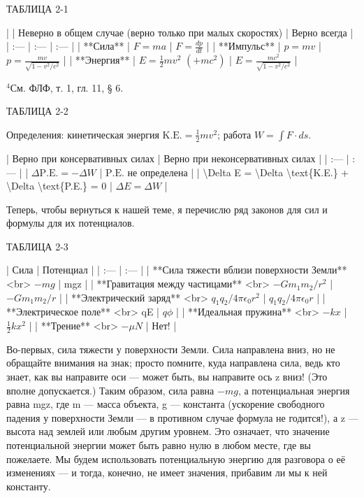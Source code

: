 \documentclass[10pt,oneside]{article}
\newcommand{\TipsRunning}[1]{\par\vspace{2bp}{\centering\footnotesize #1\par}\vspace{2bp}}
\newcommand{\TipsSubsection}[1]{\par\vspace{6bp}{\normalsize\bfseries #1\par}\vspace{2bp}}
\begin{document}
ТАБЛИЦА 2-1\par

| | Неверно в общем случае (верно только при малых скоростях) | Верно всегда | | :--- | :--- | :--- | | **Сила** | \(F = ma\) | \(F = \frac{dp}{dt}\) | | **Импульс** | \(p = mv\) | \(p = \frac{mv}{\sqrt{1-v^2/c^2}}\) | | **Энергия** | \(E = \frac{1}{2}mv^2\) \((+ mc^2)\) | \(E = \frac{mc^2}{\sqrt{1-v^2/c^2}}\) |\par

\(^4\)См. ФЛФ, т. 1, гл. 11, § 6.\par

\TipsRunning{З А К О Н Ы  И  И Н Т У И Ц И Я • 6 7}

ТАБЛИЦА 2-2\par

Определения: кинетическая энергия \(\text{K.E.} = \frac{1}{2}mv^2\); работа \(W = \int F \cdot ds\).\par

| Верно при консервативных силах | Верно при неконсервативных силах | | :--- | :--- | | \(\Delta \text{P.E.} = -\Delta W\) | \(\text{P.E.}\) не определена | | \textbackslash{}Delta E = \textbackslash{}Delta \textbackslash{}text\{K.E.\} + \textbackslash{}Delta \textbackslash{}text\{P.E.\} = 0 | \(\Delta E = \Delta W\) |\par

\TipsSubsection{2-4 Силы и их потенциалы}

Теперь, чтобы вернуться к нашей теме, я перечислю ряд законов для сил и формулы для их потенциалов.\par

ТАБЛИЦА 2-3\par

| Сила | Потенциал | | :--- | :--- | | **Сила тяжести вблизи поверхности Земли** <br> \(-mg\) | mgz | | **Гравитация между частицами** <br> \(-Gm_1m_2/r^2\) | \(-Gm_1m_2/r\) | | **Электрический заряд** <br> \(q_1q_2/4\pi\epsilon_0 r^2\) | \(q_1q_2/4\pi\epsilon_0 r\) | | **Электрическое поле** <br> qE | \(q\phi\) | | **Идеальная пружина** <br> \(-kx\) | \(\frac{1}{2}kx^2\) | | **Трение** <br> \(-\mu N\) | Нет! |\par

Во-первых, сила тяжести у поверхности Земли. Сила направлена вниз, но не обращайте внимания на знак; просто помните, куда направлена сила, ведь кто знает, как вы направите оси --- может быть, вы направите ось z вниз! (Это вполне допускается.) Таким образом, сила равна \(-mg\), а потенциальная энергия равна mgz, где m --- масса объекта, g --- константа (ускорение свободного падения у поверхности Земли --- в противном случае формула не годится!), а z --- высота над землей или любым другим уровнем. Это означает, что значение потенциальной энергии может быть равно нулю в любом месте, где вы пожелаете. Мы будем использовать потенциальную энергию для разговора о её изменениях --- и тогда, конечно, не имеет значения, прибавим ли мы к ней константу.\par
\end{document}
